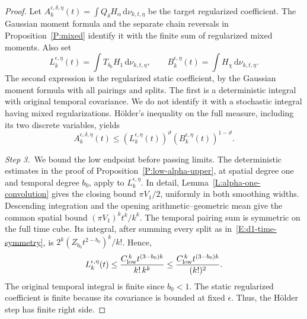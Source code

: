 \documentclass[12pt,oneside,openany]{book}
\numberwithin{equation}{section}
\theoremstyle{nogostyle}
\theoremstyle{definition}
\newcommand{\ud}{\,\mathrm{d}}
\begin{document}
\begin{proof}
  Let $A_k^{\epsilon,\delta,\eta}(t) = \int Q_\delta H_\alpha \ud\nu_{k,t,\eta}$
  be the target regularized coefficient. The Gaussian moment formula and the
  separate chain reversals in Proposition~\ref{P:mixed} identify it with the
  finite sum of regularized mixed moments. Also set
  \[
    L_k^{\epsilon,\eta}(t)=\int T_{b_0}H_1\ud\nu_{k,t,\eta},
    \qquad
    B_k^{\epsilon,\eta}(t)=\int H_\chi\ud\nu_{k,t,\eta}.
  \]
  The second expression is the regularized static coefficient, by the Gaussian
  moment formula with all pairings and splits. The first is a deterministic
  integral with original temporal covariance. We do not identify it with a
  stochastic integral having mixed regularizations. H\"older's inequality on the
  full measure, including its two discrete variables, yields
  \begin{equation}\label{E:static-holder-regularized}
    A_k^{\epsilon,\delta,\eta}(t)
    \le\left(L_k^{\epsilon,\eta}(t)\right)^\vartheta
    \left(B_k^{\epsilon,\eta}(t)\right)^{1-\vartheta}.
  \end{equation}


  \medskip
  \noindent\textit{Step 3.~}We bound the low endpoint before passing limits.
  The deterministic estimates in the proof of
  Proposition~\ref{P:low-alpha-upper}, at spatial degree one and temporal degree
  $b_0$, apply to $L_k^{\epsilon,\eta}$. In detail,
  Lemma~\ref{L:alpha-one-convolution} gives the closing bound $\pi V_1/2$,
  uniformly in both smoothing widths. Descending integration and the opening
  arithmetic--geometric mean give the common spatial bound $(\pi V_1)^kt^k/k^k$.
  The temporal pairing sum is symmetric on the full time cube. Its integral,
  after summing every split as in~\eqref{E:d1-time-symmetry}, is
  $2^k(Z_{b_0}t^{2-b_0})^k/k!$. Hence,
  \begin{equation}\label{E:static-holder-low}
    L_k^{\epsilon,\eta}(t)
    \le\frac{C_{\rm low}^{\,k}t^{(3-b_0)k}}{k!\,k^k}
    \le\frac{C_{\rm low}^{\,k}t^{(3-b_0)k}}{(k!)^2}.
  \end{equation}
  The original temporal integral is finite since $b_0 < 1$. The static
  regularized coefficient is finite because its covariance is bounded at fixed
  $\epsilon$. Thus, the H\"older step has finite right side.



\end{proof}
\end{document}
